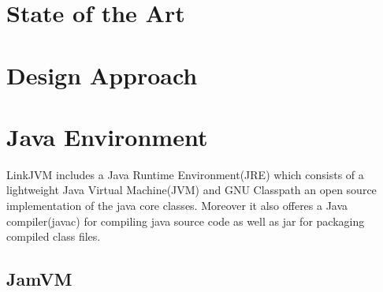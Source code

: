 \documentclass{juniorjournal}
\begin{document}
\section{State of the Art}

\section{Design Approach}

\section{Java Environment}
LinkJVM includes a Java Runtime Environment(JRE) which consists of a lightweight Java Virtual Machine(JVM) and GNU Classpath an open source implementation of the java core classes.
Moreover it also offeres a Java compiler(javac) for compiling java source code as well as jar for packaging compiled class files.
\subsection{JamVM}

\begin{thebibliography}{500} %

\end{thebibliography}
\end{document}
